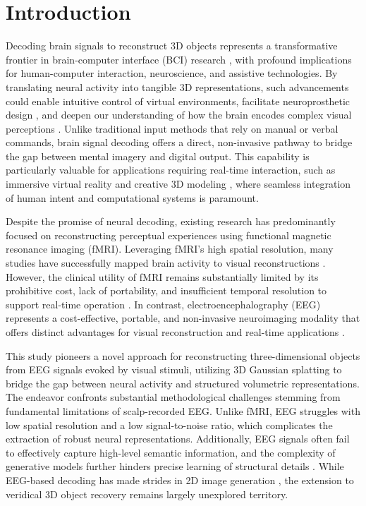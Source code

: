 \documentclass[sigconf]{acmart}
\begin{document}
\section{Introduction}
Decoding brain signals to reconstruct 3D objects represents a transformative frontier in brain-computer interface (BCI) research \cite{brumberg2018brain,pandarinath2017high}, with profound implications for human-computer interaction, neuroscience, and assistive technologies. By translating neural activity into tangible 3D representations, such advancements could enable intuitive control of virtual environments, facilitate neuroprosthetic design \cite{borton2013personalized}, and deepen our understanding of how the brain encodes complex visual perceptions \cite{naselaris2009bayesian,horikawa2017generic}. Unlike traditional input methods that rely on manual or verbal commands, brain signal decoding offers a direct, non-invasive pathway to bridge the gap between mental imagery and digital output. This capability is particularly valuable for applications requiring real-time interaction, such as immersive virtual reality \cite{slater2016enhancing} and creative 3D modeling \cite{nishino20013d}, where seamless integration of human intent and computational systems is paramount.

Despite the promise of neural decoding, existing research has predominantly focused on reconstructing perceptual experiences using functional magnetic resonance imaging (fMRI). Leveraging fMRI’s high spatial resolution, many studies have successfully mapped brain activity to visual reconstructions \cite{takagi2023high,chen2023seeing,xia2024dream,scotti2023reconstructing,gao2024mind,gao2025mind3dadvancingfmribased3d}. However, the clinical utility of fMRI remains substantially limited by its prohibitive cost, lack of portability, and insufficient temporal resolution to support real-time operation \cite{lan2023seeing}. In contrast, electroencephalography (EEG) represents a cost-effective, portable, and non-invasive neuroimaging modality that offers distinct advantages for visual reconstruction and real-time applications \cite{heckenlively2006principles}.

This study pioneers a novel approach for reconstructing three-dimensional objects from EEG signals evoked by visual stimuli, utilizing 3D Gaussian splatting \cite{kerbl20233d} to bridge the gap between neural activity and structured volumetric representations. The endeavor confronts substantial methodological challenges stemming from fundamental limitations of scalp-recorded EEG. Unlike fMRI, EEG struggles with low spatial resolution and a low signal-to-noise ratio, which complicates the extraction of robust neural representations. Additionally, EEG signals often fail to effectively capture high-level semantic information, and the complexity of generative models further hinders precise learning of structural details \cite{hebb2005organization}. While EEG-based decoding has made strides in 2D image generation \cite{kavasidis2017brain2image,mishra2023neurogan,bai2023dreamdiffusion,singh2024learning,pan2024reconstructing}, the extension to veridical 3D object recovery remains largely unexplored territory.
\end{document}
